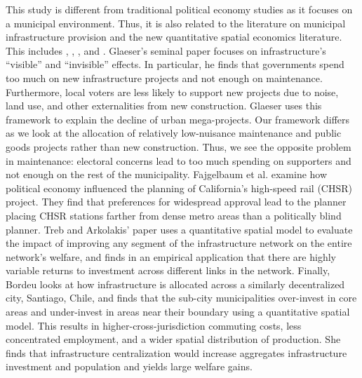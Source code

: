 This study is different from traditional political economy studies as it focuses on a municipal environment. 
Thus, it is also related to the literature on municipal infrastructure provision and the new quantitative spatial economics literature.
This includes \cite{Glaeser2018political}, \cite{Fajgelbaum2023}, \cite{treb_arkolakis_2022_infrastructure}, and \cite{bordeu2023commuting}.
Glaeser's seminal paper focuses on infrastructure's ``visible'' and ``invisible'' effects. 
In particular, he finds that governments spend too much on new infrastructure projects and not enough on maintenance.
Furthermore, local voters are less likely to support new projects due to noise, land use, and other externalities from new construction.
Glaeser uses this framework to explain the decline of urban mega-projects.
Our framework differs as we look at the allocation of relatively low-nuisance maintenance and public goods projects rather than new construction.
Thus, we see the opposite problem in maintenance: electoral concerns lead to too much spending on supporters and not enough on the rest of the municipality.
Fajgelbaum et al. examine how political economy influenced the planning of California's high-speed rail (CHSR) project.
They find that preferences for widespread approval lead to the planner placing CHSR stations farther from dense metro areas than a politically blind planner.
Treb and Arkolakis' paper uses a quantitative spatial model to evaluate the impact of improving any segment of the infrastructure network on the entire network's welfare, and finds in an empirical application that there are highly variable returns to investment across different links in the network.
Finally, Bordeu looks at how infrastructure is allocated across a similarly decentralized city, Santiago, Chile, and finds that the sub-city municipalities over-invest in core areas and under-invest in areas near their boundary using a quantitative spatial model.
This results in higher-cross-jurisdiction commuting costs, less concentrated employment, and a wider spatial distribution of production.
She finds that infrastructure centralization would increase aggregates infrastructure investment and population and yields large welfare gains.